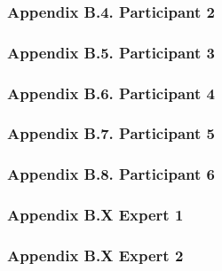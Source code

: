 \documentclass{sigchi}
\begin{document}


\subsubsection{Appendix B.4. Participant 2}



\subsubsection{Appendix B.5. Participant 3}



\subsubsection{Appendix B.6. Participant 4}



\subsubsection{Appendix B.7. Participant 5}



\subsubsection{Appendix B.8. Participant 6}



\subsubsection{Appendix B.X Expert 1}



\subsubsection{Appendix B.X Expert 2}


\end{document}
